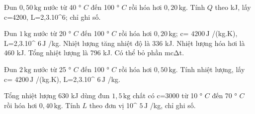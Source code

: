 \begin{ex}
Đun $0,50\,\text{kg}$ nước từ 40 ° $C$ đến 100 ° $C$ rồi hóa hơi $0,20\,\text{kg}$. Tính $Q$ theo kJ, lấy c=4200, L=2,3.10^6; chỉ ghi số.
\end{ex}

\begin{ex}
Đun $1\,\text{kg}$ nước từ 20 ° $C$ đến 100 ° $C$ rồi hóa hơi $0,20\,\text{kg}$; c= $4200\,\text{J}$ /(kg.K), L=2,3.10^ $6\,\text{J}$ /kg.
\choiceTF
{\True Nhiệt lượng tăng nhiệt độ là 336 kJ.}
{\True Nhiệt lượng hóa hơi là 460 kJ.}
{\True Tổng nhiệt lượng là 796 kJ.}
{Có thể bỏ phần mcΔt.}
\end{ex}

\begin{bt}
Đun $2\,\text{kg}$ nước từ 25 ° $C$ đến 100 ° $C$ rồi hóa hơi $0,50\,\text{kg}$. Tính nhiệt lượng, lấy c= $4200\,\text{J}$ /(kg.K), L=2,3.10^ $6\,\text{J}$ /kg.
\end{bt}

\begin{ex}
Tổng nhiệt lượng 630 kJ dùng đun $1,5\,\text{kg}$ chất có c=3000 từ 10 ° $C$ đến 70 ° $C$ rồi hóa hơi $0,40\,\text{kg}$. Tính $L$ theo đơn vị 10^ $5\,\text{J}$ /kg, chỉ ghi số.
\end{ex}

